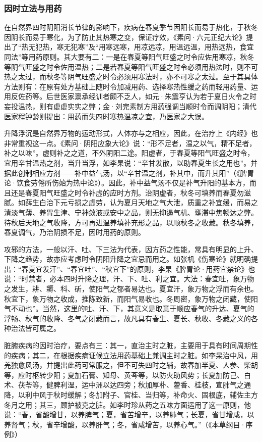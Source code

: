 \documentclass[draft,12pt]{ctexbook}
\begin{document}
\subsubsection{因时立法与用药}%

在自然界四时阴阳消长节律的影响下，疾病在春夏季节因阳长而易于热化，于秋冬因阴长而易于寒化，为了防止其热寒之变，保证疗效，《素问·六元正纪大论》提出了“热无犯热，寒无犯寒”及“用寒远寒，用凉远凉，用温远温，用热远热，食宜同法”等用药原则。其大要有二：一是在春夏等阳气旺盛之时令应佐用寒凉，秋冬等阴气旺盛之时令佐用温热；二是若春夏等阳气旺盛之时令必须用热法时，则不可热之太过，而秋冬等阴气旺盛之时令必须用寒法时，亦不可寒之太过。至于其具体方法则有：在原有处方基础上随时令加减用药、选择寒热性缓之药而轻用药量、运用反佐药等。后世医家禀承经训者颇不乏人，如元·朱震亨认为若于夏日火令之时妄投温热，则有虚虚实实之弊；金·刘完素制方用药强调当顺时令而调阴阳；清代医家程钟龄则提出：用药而失四时寒热温凉之宜，乃医家之大误。

升降浮沉是自然界万物的运动形式，人体亦与之相应，因此，在治疗上《内经》也非常重视这一点。《素问·阴阳应象大论》说：“形不足者，温之以气，精不足者，补之以味”。虚则补之之道，不外阴阳二途。阳虚者，于春夏等阳气旺盛之时令，宜用辛甘温热之剂，当升当浮，如李杲说：“辛甘发散，以助春夏生长之用也”。并据此创制相应方剂——补中益气汤，以“辛甘温之剂，补其中，而升其阳”（《脾胃论·饮食劳倦所伤始为热中论》）。因此，补中益气汤不仅是补气升阳的基本方，而且还是春夏阳气旺盛之时令补虚的应时方剂。治阴虚者，秋冬可填养而春夏勿滋腻。如薛生白治下元亏损之虚劳，认为夏月天地之气大泄，质重之补宜缓，而易之清淡气薄、养胃生津、宁神敛液或安中之品，则无抑遏气机、壅滞中焦畅达之弊。待秋后天地之气收降，方可再进温养填补充形之品，以顺秋冬之收藏。秋冬填养，春夏调气，乃治阴损不足，因时用药的原则。

攻邪的方法，一般以汗、吐、下三法为代表，因方药之性能，常具有明显的上升、下降之趋势，故亦应考虑时令阴阳升降之宜忌而用之。如张机《伤寒论》就明确提出：“春夏宜发汗”、“春宜吐”、“秋宜下”的原则，李杲《脾胃论·用药宜禁论》也说：“时禁者，必本四时升降之理，汗、下、吐、利之宜。大法：春宜吐，象万物之发生，耕、耨、科、斫，使阳气之郁者易达也。夏宜汗，象万物之浮而有余也。秋宜下，象万物之收成，推陈致新，而阳气易收也。冬周密，象万物之闭藏，使阳气不动也”。当然，这里的吐、汗、下，其意义是取意于顺应春气的升达、夏气的浮畅、秋气的收降、冬气之闭藏而言，故凡具有春生、夏长、秋收、冬藏之义的各种治法皆可属之。

脏腑疾病的因时治疗，要点有三：其一，直治主时之脏，主要用于具有时间周期性的疾病；其二，在根据疾病证候立法用药基础上兼调主时之脏。如李杲治中风，用羌独愈风汤，并提出此药可常服之，但不可失四时之辅，故春加半夏、人参、柴胡等，应时枢转少阳；夏加石膏、知母、黄芩等，以防火助风势；长夏加防己、白术、茯苓等，健脾利湿，运中洲以达四旁；秋加厚朴、藿香、桂枝，宣肺气之通降，以利中风于秋时缓解；冬加附子、官桂、当归等，补命火、固根底，辅佐主方冬月之用；其三，顾护被克之脏。如李时珍从药之五味方面运用了这一原则，他说：“春，省酸增甘，以养脾气；夏，省苦增辛，以养肺气；长夏，省甘增咸，以养肾气；秋，省辛增酸，以养肝气；冬，省咸增苦，以养心气。”（《本草纲目·序例》）
\end{document}
